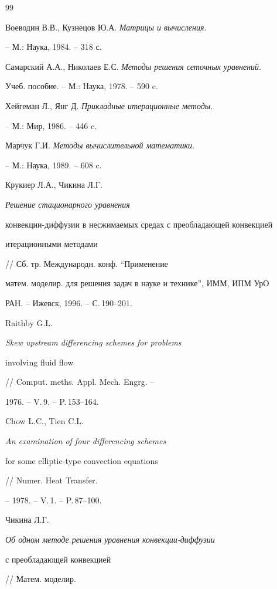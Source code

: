\begin{thebibliography}{99} 


 




Воеводин В.В., Кузнецов Ю.А. {\em Матрицы и вычисления}. 


-- М.: Наука, 1984. -- 318 с. 




Самарский А.А., Николаев Е.С. {\em Методы решения сеточных уравнений}. 


Учеб. пособие. -- М.: Наука, 1978. -- 590 c. 




Хейгеман Л., Янг Д. {\em Прикладные итерационные методы}. 


-- М.: Мир, 1986. -- 446 c. 




Марчук Г.И. {\em Методы вычислительной математики}. 


-- М.: Наука, 1989. -- 608 c. 




Крукиер Л.А., Чикина Л.Г. {\em Решение стационарного уравнения 


конвекции-диффузии в несжимаемых средах с преобладающей конвекцией 


итерационными методами} // Сб. тр. Международн. конф. ``Применение 


матем. моделир. для решения задач в науке и технике'', ИММ, ИПМ УрО 


РАН. -- Ижевск, 1996. -- С.\,190--201. 




Raithby G.L. {\em Skew upstream differencing schemes for problems 


involving fluid flow} // Comput. meths. Appl. Mech. Engrg. -- 


1976. -- V.\,9. -- P.\,153--164. 




Chow L.C., Tien C.L. {\em An examination of four differencing schemes 


for some elliptic-type convection equations} // Numer. Heat Transfer. 


-- 1978. -- V.\,1. -- P.\,87--100. 




Чикина Л.Г. {\em Об одном методе решения уравнения конвекции-диффузии 


с преобладающей конвекцией} // Матем. моделир. 



\end{thebibliography}
